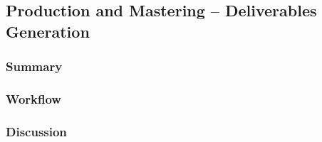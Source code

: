 \subsection{Production and Mastering -- Deliverables Generation} \label{subsec:ff-mastering}

	\subsubsection{Summary}
	
	\lipsum[1] %
	
	\subsubsection{Workflow}
	
	\lipsum[1] %
	
	\subsubsection{Discussion}
	
	\lipsum[1] %
	